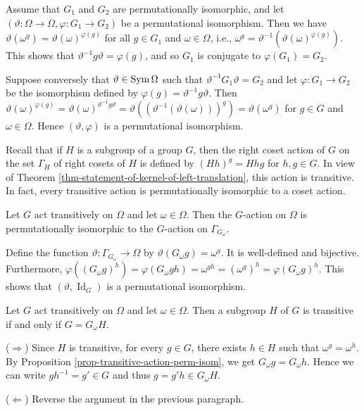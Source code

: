 \begin{sketch}
	Assume that $G_1$ and $G_2$ are permutationally isomorphic, and let $(\vartheta:\Omega\to \Omega, \varphi:G_1\rightarrow G_2)$ be a permutational isomorphism. Then we have $\vartheta(\omega^g) = \vartheta(\omega)^{\varphi(g)}$ for all $g \in G_1$ and $\omega \in \Omega$, i.e., $\omega^g = \vartheta^{-1}(\vartheta(\omega)^{\varphi(g)})$. This shows that $\vartheta^{-1}g\vartheta = \varphi(g)$, and so $G_1$ is conjugate to $\varphi(G_1) = G_2$.
	
	Suppose conversely that $\vartheta \in \operatorname{Sym}\Omega$ such that $\vartheta^{-1}G_1\vartheta = G_2$ and let $\varphi: G_1 \to G_2$ be the isomorphism defined by  $\varphi(g) = \vartheta^{-1}g\vartheta$. Then  $\vartheta(\omega)^{\varphi(g)} = \vartheta(\omega)^{\vartheta^{-1}g\vartheta} = \vartheta((\vartheta^{-1}(\vartheta(\omega)))^{g}) = \vartheta(\omega^g)$ for $g \in G$ and $\omega \in \Omega$. Hence $(\vartheta, \varphi)$ is a permutational isomorphism.
\end{sketch}

 Recall that if $H$ is a subgroup of  a group $G$, then the right coset action of $G$ on the set $\Gamma_H$ of right cosets of $H$  is defined by $(Hh)^g  = Hhg$ for $h,g\in G$. In view of Theorem \ref{thm-statement-of-kernel-of-left-translation}, this action is transitive. In fact, every transitive action is permutationally isomorphic to a coset action. 
\begin{proposition} \label{prop-transitive-action-perm-isom}
	Let $G$ act transitively on $\Omega$ and let $\omega\in \Omega$. Then the $G$-action on $\Omega$ is permutationally isomorphic to the $G$-action on $\Gamma_{G_\omega}$.
\end{proposition}
\begin{sketch}
	Define the function $\vartheta: \Gamma_{G_\omega}\to \Omega$ by $\vartheta(G_\omega g) = \omega^g$. It is well-defined and bijective. Furthermore, $\varphi((G_\omega g)^h) = \varphi(G_\omega gh) = \omega^{gh} = (\omega^{g})^h = \varphi(G_\omega g)^h$. This shows that $(\vartheta,\operatorname{Id}_G)$ is a permutational isomorphism.
\end{sketch}

\begin{corollary}
	Let $G$ act transitively on $\Omega$ and let $\omega\in\Omega$. Then a subgroup $H$ of $G$ is transitive if and only if $G = G_\omega H$.
\end{corollary}
\begin{sketch}
	($\Rightarrow$) Since $H$ is transitive, for every $g\in G$, there exists $h\in H$ such that $\omega^g = \omega^h$. By Proposition \ref{prop-transitive-action-perm-isom}, we get $G_\omega g = G_\omega h$. Hence we can write $gh^{-1} = g'\in G$ and thus $g = g'h\in G_\omega H$.
	
	($\Leftarrow$) Reverse the argument in the previous paragraph.
\end{sketch}

